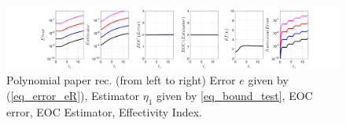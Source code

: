 \documentclass[12pt,a4paper]{article}
\numberwithin{equation}{section}
\theoremstyle{definition}
\begin{document}
\begin{figure}[H]
	\hspace{-3cm}
	\includegraphics[scale=0.55]{fig_LeapFrogplots_1x5_sin_IC_harmonic_u3_v7_paperrec_poly}	
	\caption{Polynomial paper rec. (from left to right) Error $e$ given by (\ref{eq_error_eR}), Estimator $\eta_1$ given by \ref{eq_bound_test},   EOC error, EOC Estimator, Effectivity Index.}
	\label{fig_all_in_one_paperrec_polynomial_u03_v07}
\end{figure}
\end{document}
